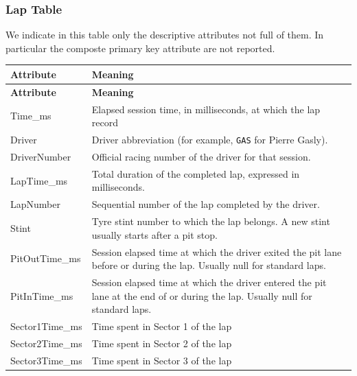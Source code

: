 \documentclass[a4paper,11pt]{article}
\begin{document}
	\subsubsection{Lap Table}
	
	We indicate in this table only the descriptive attributes not full of them. In particular the composte primary key attribute are not reported.
	
	\begin{longtable}{|p{4cm}|p{10.8cm}|}
		\hline
		\textbf{Attribute} & \textbf{Meaning} \\
		\hline
		\endfirsthead
		
		\hline
		\textbf{Attribute} & \textbf{Meaning} \\
		\hline
		\endhead
		
		Time\_ms & Elapsed session time, in milliseconds, at which the lap record  \\ \hline
		
		Driver & Driver abbreviation (for example, \texttt{GAS} for Pierre Gasly). \\ \hline
		
		DriverNumber & Official racing number of the driver for that session. \\ \hline
		
		LapTime\_ms & Total duration of the completed lap, expressed in milliseconds.  \\ \hline
		
		LapNumber & Sequential number of the lap completed by the driver. \\ \hline
		
		Stint & Tyre stint number to which the lap belongs. A new stint usually starts after a pit stop. \\ \hline
		
		PitOutTime\_ms & Session elapsed time at which the driver exited the pit lane before or during the lap. Usually null for standard laps. \\ \hline
		
		PitInTime\_ms & Session elapsed time at which the driver entered the pit lane at the end of or during the lap. Usually null for standard laps. \\ \hline
		
		Sector1Time\_ms & Time spent in Sector 1 of the lap \\ \hline
		Sector2Time\_ms & Time spent in Sector 2 of the lap \\ \hline
		Sector3Time\_ms & Time spent in Sector 3 of the lap \\ \hline
		

\end{longtable}
\end{document}
